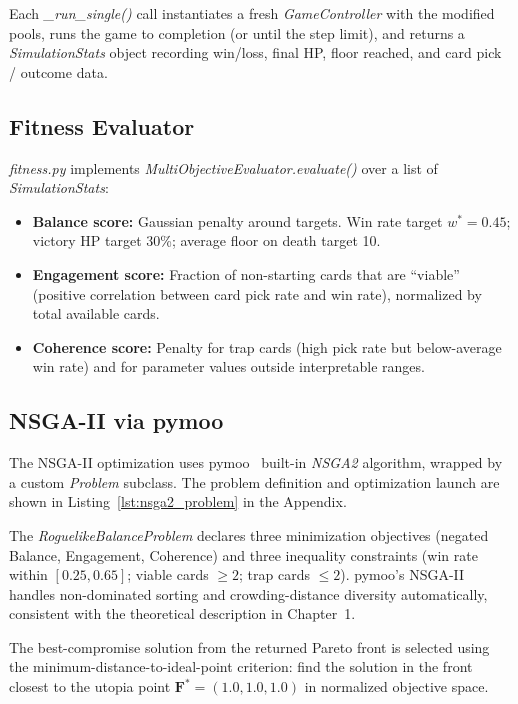 Each \textit{\_run\_single()} call instantiates a fresh \textit{GameController} with the modified pools, runs the game to completion (or until the step limit), and returns a \textit{SimulationStats} object recording win/loss, final HP, floor reached, and card pick / outcome data.

\subsection{Fitness Evaluator}

\textit{fitness.py} implements \textit{MultiObjectiveEvaluator.evaluate()} over a list of \textit{SimulationStats}:

\begin{itemize}
    \item \textbf{Balance score:} Gaussian penalty around targets. Win rate target $w^* = 0.45$; victory HP target 30\%; average floor on death target 10.
    \item \textbf{Engagement score:} Fraction of non-starting cards that are ``viable'' (positive correlation between card pick rate and win rate), normalized by total available cards.
    \item \textbf{Coherence score:} Penalty for trap cards (high pick rate but below-average win rate) and for parameter values outside interpretable ranges.
\end{itemize}

\subsection{NSGA-II via pymoo}

The NSGA-II optimization uses pymoo~\cite{blank2020pymoo} built-in \textit{NSGA2} algorithm, wrapped by a custom \textit{Problem} subclass. The problem definition and optimization launch are shown in Listing~\ref{lst:nsga2_problem} in the Appendix.

The \textit{RoguelikeBalanceProblem} declares three minimization objectives (negated Balance, Engagement, Coherence) and three inequality constraints (win rate within $[0.25, 0.65]$; viable cards $\geq 2$; trap cards $\leq 2$). pymoo's NSGA-II handles non-dominated sorting and crowding-distance diversity automatically, consistent with the theoretical description in Chapter~1.

\begin{sloppypar}
The best-compromise solution from the returned Pareto front is selected using the minimum-distance-to-ideal-point criterion: find the solution in the front closest to the utopia point $\mathbf{F}^* = (1.0, 1.0, 1.0)$ in normalized objective space.
\end{sloppypar}
